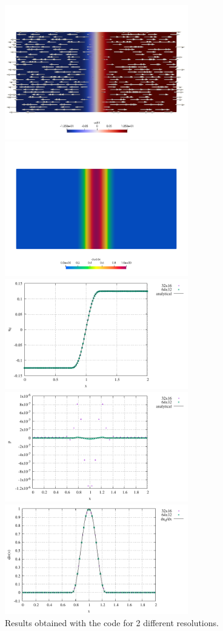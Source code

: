 \begin{center}
\includegraphics[width=8cm]{python_codes/fieldstone_175/results/exp2/ud.png}
\includegraphics[width=8cm]{python_codes/fieldstone_175/results/exp2/duddx.png}\\
\includegraphics[width=8cm]{python_codes/fieldstone_175/results/exp2/ud.pdf}\\
\includegraphics[width=8cm]{python_codes/fieldstone_175/results/exp2/p.pdf}
\includegraphics[width=8cm]{python_codes/fieldstone_175/results/exp2/divv.pdf}\\
{\captionfont Results obtained with the code for 2 different resolutions.}
\end{center}


